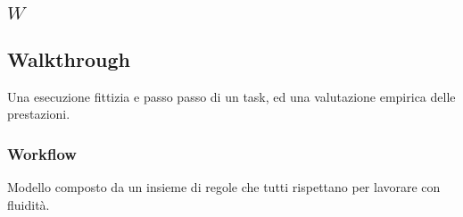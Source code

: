 \subsection*{\quad$W\quad$}
\subsection{Walkthrough}
Una esecuzione fittizia e passo
passo di un task, ed una valutazione empirica delle
prestazioni. 
\subsubsection*{Workflow}
Modello composto da un insieme di regole che tutti rispettano per lavorare con fluidità.

